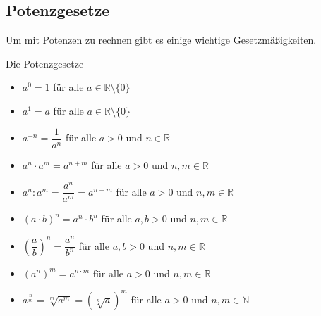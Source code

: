 \subsection{Potenzgesetze}
Um mit Potenzen zu rechnen gibt es einige wichtige Gesetzmäßigkeiten.
\begin{merke}{Die Potenzgesetze}{} 
\begin{itemize}
    \item $a^0 = 1$ für alle $a\in \mathds{R}\setminus\{0\}$
    \item $a^1 =a$ für alle $a\in \mathds{R}\setminus\{0\}$
    \item $a^{-n} = \dfrac{1}{a^n}$ für alle $a>0$ und $n \in \mathds{R}$
    \item $a^n \cdot a^m = a^{n+m}$ für alle $a>0$ und $n,m \in \mathds{R}$
    \item $a^n : a^m = \dfrac{a^n}{a^m} = a^{n-m}$ für alle $a>0$ und $n,m \in \mathds{R}$
    \item $(a\cdot b)^n = a^n \cdot b^n$ für alle $a,b>0$ und $n,m \in \mathds{R}$
    \item $\left(\dfrac{a}{b}\right)^n = \dfrac{a^n}{b^n}$ für alle $a,b>0$ und $n,m \in \mathds{R}$
    \item $ \left( a^n \right)^m = a^{n\cdot m}$ für alle $a>0$ und $n,m \in \mathds{R}$
    \item $a^{\frac{n}{m}} = \sqrt[m]{a^m} = \left( \sqrt[n]{a}\right)^m$ für alle $a>0$ und $n,m \in \mathds{N}$
\end{itemize}
\end{merke}
